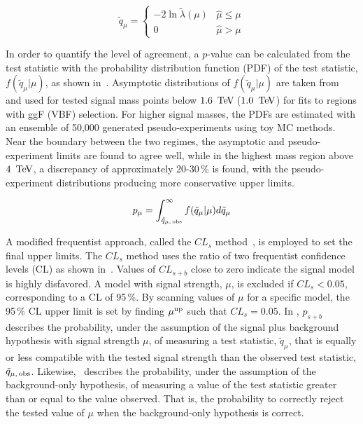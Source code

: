 \begin{equation}
\tilde{q}_{\mu} = \begin{cases}-2\ln\tilde{\lambda}(\mu)&\hat{\mu}\leq \mu\\ 0 & \hat{\mu}>\mu \end{cases} \label{eq:qmu}
\end{equation}

In order to quantify the level of agreement, a $p$-value can be calculated from the test statistic with the probability distribution function (PDF) of the test statistic, $f(\tilde{q}_{\mu}|\mu)$, as shown in~\Eqn{\ref{eq:pmu}}. Asymptotic distributions of $f(\tilde{q}_{\mu}|\mu)$ are taken from~ and used for tested signal mass points below $1.6\,\TeV$\,($1.0\,\TeV$) for fits to regions with ggF (VBF) selection. For higher signal masses, the PDFs are estimated with an ensemble of 50,000 generated pseudo-experiments using toy MC methods. Near the boundary between the two regimes, the asymptotic and pseudo-experiment limits are found to agree well, while in the highest mass region above $4\,\TeV$, a discrepancy of approximately 20-30\,\% is found, with the pseudo-experiment distributions producing more conservative upper limits. 

\begin{equation}
p_{\mu} = \int_{\tilde{q}_{\mu,\,\rm obs}}^{\infty} f(\tilde{q}_{\mu}|\mu) d\tilde{q}_{\mu}  \label{eq:pmu}
\end{equation}
 

A modified frequentist approach, called the $CL_s$ method~\cite{cls_stats}, is employed to set the final upper limits. The $CL_s$ method uses the ratio of two frequentist confidence levels (CL) as shown in~\Eqnrange{\ref{eq:cls:a}}{\ref{eq:cls:d}}.
Values of $CL_{s+b}$ close to zero indicate the signal model is highly disfavored. 
A model with signal strength, $\mu$, is excluded if $CL_s<0.05$, corresponding to a CL of 95\,\%. By scanning values of $\mu$ for a specific model, the 95\,\% CL upper limit is set by finding $\mu^{\rm up}$ such that $CL_s=0.05$. In \Eqn{\ref{eq:cls:c}}, $p_{s+b}$ describes the probability, under the assumption of the signal plus background hypothesis with signal strength $\mu$, of measuring a test statistic, $\tilde{q}_{\mu}$, that is equally or less compatible with the tested signal strength than the observed test statistic, $\tilde{q}_{\mu,\,\rm obs}$.  Likewise,~\Eqn{\ref{eq:cls:d}} describes the probability, under the assumption of the background-only hypothesis, of measuring a value of the test statistic greater than or equal to the value observed. That is, the probability to correctly reject the tested value of $\mu$ when the background-only hypothesis is correct. 

